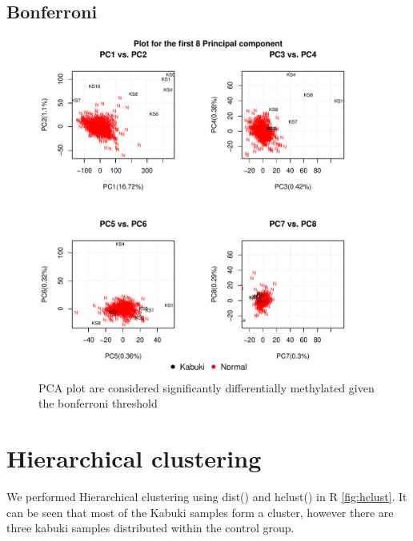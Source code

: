 \subsection{Bonferroni}
\begin{figure}[!h]
    \centering
    \includegraphics[width=\textwidth]{figures/PCA/bonferroni/pca_plot_label.pdf}
    \caption{PCA plot are considered significantly differentially methylated given the bonferroni threshold}
    \label{fig:bonferroni-PCA}
\end{figure}


\section{Hierarchical clustering}
We performed Hierarchical clustering using dist() and hclust() in R \ref{fig:hclust}. It can be seen that most of the Kabuki samples form a cluster, however there are three kabuki samples distributed within the control group.

